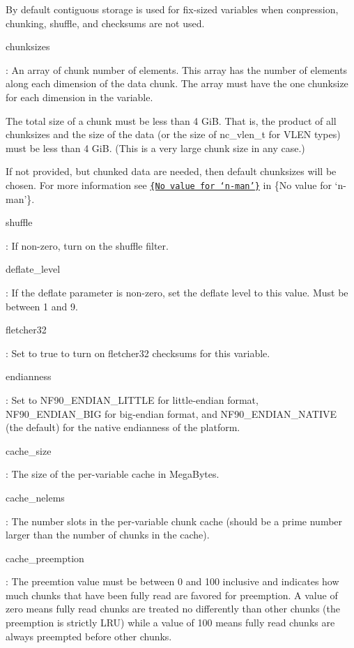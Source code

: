 By default contiguous storage is used for fix-\/sized variables when conpression, chunking, shuffle, and checksums are not used.

{\ttfamily chunksizes}

\+: An array of chunk number of elements. This array has the number of elements along each dimension of the data chunk. The array must have the one chunksize for each dimension in the variable.

The total size of a chunk must be less than 4 GiB. That is, the product of all chunksizes and the size of the data (or the size of nc\+\_\+vlen\+\_\+t for V\+L\+EN types) must be less than 4 GiB. (This is a very large chunk size in any case.)

If not provided, but chunked data are needed, then default chunksizes will be chosen. For more information see \href{netcdf.html#Chunking}{\tt \{No value for ‘n-\/man’\}} in \{No value for ‘n-\/man’\}.

{\ttfamily shuffle}

\+: If non-\/zero, turn on the shuffle filter.

{\ttfamily deflate\+\_\+level}

\+: If the deflate parameter is non-\/zero, set the deflate level to this value. Must be between 1 and 9.

{\ttfamily fletcher32}

\+: Set to true to turn on fletcher32 checksums for this variable.

{\ttfamily endianness}

\+: Set to N\+F90\+\_\+\+E\+N\+D\+I\+A\+N\+\_\+\+L\+I\+T\+T\+LE for little-\/endian format, N\+F90\+\_\+\+E\+N\+D\+I\+A\+N\+\_\+\+B\+IG for big-\/endian format, and N\+F90\+\_\+\+E\+N\+D\+I\+A\+N\+\_\+\+N\+A\+T\+I\+VE (the default) for the native endianness of the platform.

{\ttfamily cache\+\_\+size}

\+: The size of the per-\/variable cache in Mega\+Bytes.

{\ttfamily cache\+\_\+nelems}

\+: The number slots in the per-\/variable chunk cache (should be a prime number larger than the number of chunks in the cache).

{\ttfamily cache\+\_\+preemption}

\+: The preemtion value must be between 0 and 100 inclusive and indicates how much chunks that have been fully read are favored for preemption. A value of zero means fully read chunks are treated no differently than other chunks (the preemption is strictly L\+RU) while a value of 100 means fully read chunks are always preempted before other chunks.

